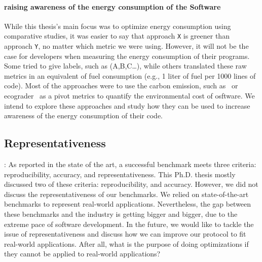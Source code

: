 \paragraph{raising awareness of the energy consumption of the Software}
While this thesis's main focus was to optimize energy consumption using comparative studies, it was easier to say that approach \texttt{X} is greener than approach \texttt{Y}, no matter which metric we were using.
However, it will not be the case for developers when measuring the energy consumption of their programs.
Some tried to give labels, such as (A,B,C\dots), while others translated these raw metrics in an equivalent of fuel consumption (e.g., 1 liter of fuel per 1000 lines of code).
Most of the approaches were to use the carbon emission, such as~\cite{patterson2021carbon} or ecograder~ as a pivot metrics to quantify the environmental cost of osftware.
We intend to explore these approaches and study how they can be used to increase awareness of the energy consumption of their code.



\subsection*{Representativeness}:
As reported in the state of the art, a successful benchmark meets three criteria: reproducibility, accuracy, and representativeness.
This Ph.D. thesis mostly discussed two of these criteria: reproducibility, and accuracy.
However, we did not discuss the representativeness of our benchmarks.
We relied on state-of-the-art benchmarks to represent real-world applications.
Nevertheless, the gap between these benchmarks and the industry is getting bigger and bigger, due to the extreme pace of software development.
In the future, we would like to tackle the issue of representativeness and discuss how we can improve our protocol to fit real-world applications.
After all, what is the purpose of doing optimizations if they cannot be applied to real-world applications?

